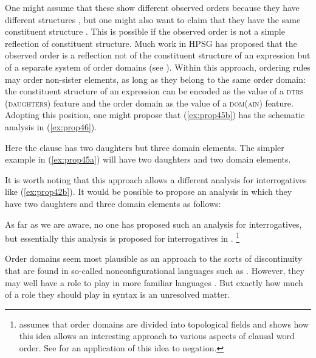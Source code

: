\documentclass[output=paper
	        ,collection
	        ,collectionchapter
 	        ,biblatex
                ,babelshorthands
                ,newtxmath
                ,draftmode
                ,colorlinks, citecolor=brown
]{langscibook}
\begin{document}
\noindent
One might assume that these show different observed orders because they have different structures
\citep{Kiss2005a}, but one might also want to claim that they have the same constituent structure
\citep{KP95a}. This is possible if the observed order is not a simple reflection of constituent
structure. Much work in HPSG has proposed that the observed order is a reflection not of the
constituent structure of an expression but of a separate system of order domains (see
\citealp{Reape94a,Babel,Kathol2000a}). Within this approach, ordering rules may order non-sister
elements, as long as they belong to the same order domain: the constituent structure of an
expression can be encoded as the value of a \textsc{dtrs (daughters)} feature and the order domain
as the value of a \textsc{dom(ain)} feature. Adopting this position, one might propose that
(\ref{ex:prop45b}) has the schematic analysis in (\ref{ex:prop46}). 

\ea\label{ex:prop46}
\z

\noindent
Here the clause has two daughters but three domain elements. The simpler example in (\ref{ex:prop45a}) will have two daughters and two domain elements.

It is worth noting that this approach allows a different analysis for interrogatives like (\ref{ex:prop42b}). It would be possible to propose an analysis in which they have two daughters and three domain elements as follows:

\ea\label{ex:prop47}
\z

\noindent
As far as we are aware, no one has proposed such an analysis for  interrogatives, but essentially this analysis is proposed for  interrogatives in \citet[81]{Kathol2000a}.%
%
\footnote{\citet{Kathol2000a} assumes that order domains are divided into topological fields and shows how this idea allows an interesting approach to various aspects of clausal word order. See \citet{Borsley:06} for an application of this idea to negation.}
%

Order domains seem most plausible as an approach to the sorts of discontinuity that are found in so-called nonconfigurational languages such as  \citep{DS99a}. However, they may well have a role to play in more familiar languages \citep{BGM99a,Chaves2014a-u}. But exactly how much of a role they should play in syntax is an unresolved matter.
\end{document}

